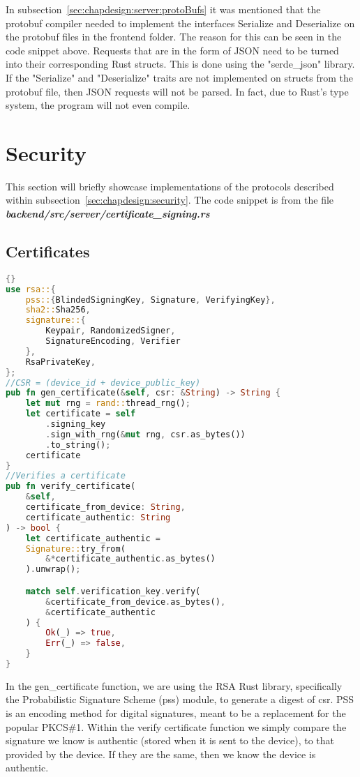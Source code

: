 In subsection~\ref{sec:chapdesign:server:protoBufs} it was mentioned that the protobuf compiler needed to implement the interfaces Serialize and Deserialize on the protobuf files in the frontend folder. The reason for this can be seen in the code snippet above. Requests that are in the form of JSON need to be turned into their corresponding Rust structs. This is done using the "serde\_json" library. If the "Serialize" and "Deserialize" traits are not implemented on structs from the protobuf file, then JSON requests will not be parsed. In fact, due to Rust's type system, the program will not even compile.

\section{Security} \label{sec:chapimpl:security}
This section will briefly showcase implementations of the protocols described within subsection~\ref{sec:chapdesign:security}. The code snippet is from the file \textit{\textbf{backend/src/server/certificate\_signing.rs}} 

\subsection{Certificates} \label{sec:chapimpl:security:certificates}
\begin{lstlisting}[language=Rust, style=boxed, showstringspaces=false]{}
use rsa::{
    pss::{BlindedSigningKey, Signature, VerifyingKey},
    sha2::Sha256,
    signature::{
        Keypair, RandomizedSigner, 
        SignatureEncoding, Verifier
    },
    RsaPrivateKey,
};
//CSR = (device_id + device_public_key)
pub fn gen_certificate(&self, csr: &String) -> String {
    let mut rng = rand::thread_rng();
    let certificate = self
        .signing_key
        .sign_with_rng(&mut rng, csr.as_bytes())
        .to_string();
    certificate
}
//Verifies a certificate 
pub fn verify_certificate(
    &self,
    certificate_from_device: String,
    certificate_authentic: String
) -> bool {
    let certificate_authentic = 
    Signature::try_from(
        &*certificate_authentic.as_bytes()
    ).unwrap();

    match self.verification_key.verify(
        &certificate_from_device.as_bytes(),
        &certificate_authentic
    ) {
        Ok(_) => true,
        Err(_) => false,
    }
}
\end{lstlisting}
In the gen\_certificate function, we are using the RSA Rust library, specifically the Probabilistic Signature Scheme (pss) module, to generate a digest of csr. PSS is an encoding method for digital signatures, meant to be a replacement for the popular PKCS\#1. Within the verify certificate function we simply compare the signature we know is authentic (stored when it is sent to the device), to that provided by the device. If they are the same, then we know the device is authentic. 

